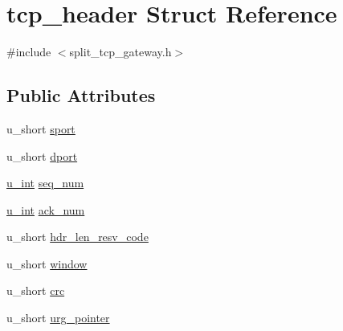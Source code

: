 \hypertarget{structtcp__header}{\section{tcp\-\_\-header \-Struct \-Reference}
\label{structtcp__header}
}


{\ttfamily \#include $<$split\-\_\-tcp\-\_\-gateway.\-h$>$}

\subsection*{\-Public \-Attributes}
\begin{DoxyCompactItemize}
\item 
u\-\_\-short \hyperlink{structtcp__header_a36d1e56a05521e48f27b290522734462}{sport}
\item 
u\-\_\-short \hyperlink{structtcp__header_afad92b412e085a6237a98f7dcd0e1744}{dport}
\item 
\hyperlink{split__tcp__gateway_8h_ac319c165d52643e43249fe003e18bdf3}{u\-\_\-int} \hyperlink{structtcp__header_ae16e608ea5df1f84820820972c04f45e}{seq\-\_\-num}
\item 
\hyperlink{split__tcp__gateway_8h_ac319c165d52643e43249fe003e18bdf3}{u\-\_\-int} \hyperlink{structtcp__header_ae452d7741f9b70695a797e2bb2608479}{ack\-\_\-num}
\item 
u\-\_\-short \hyperlink{structtcp__header_a957cd867a63215d329c43eb6a1cfbd4a}{hdr\-\_\-len\-\_\-resv\-\_\-code}
\item 
u\-\_\-short \hyperlink{structtcp__header_a0b1bdce92d75ab4e05309ae6b666a6b2}{window}
\item 
u\-\_\-short \hyperlink{structtcp__header_ac0b5df1d697bf90d8286b889609daca0}{crc}
\item 
u\-\_\-short \hyperlink{structtcp__header_a8ca2bf27396ec84f7a08c4c3ac41cba1}{urg\-\_\-pointer}
\end{DoxyCompactItemize}


